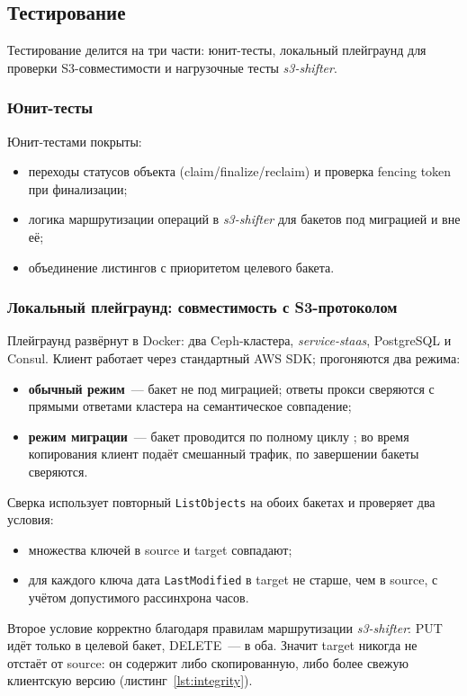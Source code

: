 \subsection{Тестирование}\label{subsec:testing}

Тестирование делится на три части: юнит-тесты, локальный плейграунд для проверки S3-совместимости и нагрузочные тесты \textit{s3-shifter}.

\subsubsection{Юнит-тесты}\label{subsubsec:unit-tests}

Юнит-тестами покрыты:
\begin{itemize}
    \item переходы статусов объекта (claim/finalize/reclaim) и проверка fencing token при финализации;
    \item логика маршрутизации операций в \textit{s3-shifter} для бакетов под миграцией и вне её;
    \item объединение листингов с приоритетом целевого бакета.
\end{itemize}

\subsubsection{Локальный плейграунд: совместимость с S3-протоколом}\label{subsubsec:playground}

Плейграунд развёрнут в Docker: два Ceph-кластера, \textit{service-staas}, PostgreSQL и Consul.
Клиент работает через стандартный AWS SDK; прогоняются два режима:
\begin{itemize}
    \item \textbf{обычный режим}~--- бакет не под миграцией; ответы прокси сверяются с прямыми ответами кластера на семантическое совпадение;
    \item \textbf{режим миграции}~--- бакет проводится по полному циклу ; во время копирования клиент подаёт смешанный трафик, по завершении бакеты сверяются.
\end{itemize}

Сверка использует повторный \texttt{ListObjects} на обоих бакетах и проверяет два условия:
\begin{itemize}
    \item множества ключей в source и target совпадают;
    \item для каждого ключа дата \texttt{LastModified} в target не старше, чем в source, с учётом допустимого рассинхрона часов.
\end{itemize}
Второе условие корректно благодаря правилам маршрутизации \textit{s3-shifter}: PUT идёт только в целевой бакет, DELETE~--- в оба. Значит target никогда не отстаёт от source: он содержит либо скопированную, либо более свежую клиентскую версию (листинг~\ref{lst:integrity}).

